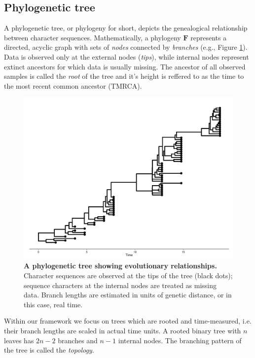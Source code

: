 \documentclass[12pt,twoside]{mitthesis}
\theoremstyle{plain}
\theoremstyle{definition}
\theoremstyle{remark}
\begin{document}

\subsection{Phylogenetic tree}

A phylogenetic tree, or phylogeny for short, depicts the genealogical relationship between character sequences.
Mathematically, a phylogeny $\mathbf{F}$ represents a directed, acyclic graph with sets of \emph{nodes} connected by \emph{branches} (e.g., Figure \ref{fig:treeconcept}).
Data is observed only at the external nodes (\emph{tips}), while internal nodes represent extinct ancestors for which data is usually missing.
The ancestor of all observed samples is called the \emph{root} of the tree and it's height is reffered to as the time to the most recent common ancestor (TMRCA).

\begin{figure}[H]
\begin{center}
\includegraphics[scale=0.35]{treeconcept} 
\end{center}
\caption{{ \footnotesize {\bf A phylogenetic tree showing evolutionary relationships.} 
Character sequences are observed at the tips of the tree (black dots); sequence characters at the internal nodes are treated as missing data. 
Branch lengths are estimated in units of genetic distance, or in this case, real time.
}}
\label{fig:treeconcept}
\end{figure}

Within our framework we focus on trees which are rooted and time-measured, i.e. their branch lengths are scaled in actual time units.
A rooted binary tree with $n$ leaves has $2n-2$ branches and $n-1$ internal nodes.
The branching pattern of the tree is called the \emph{topology}. 
\end{document}

